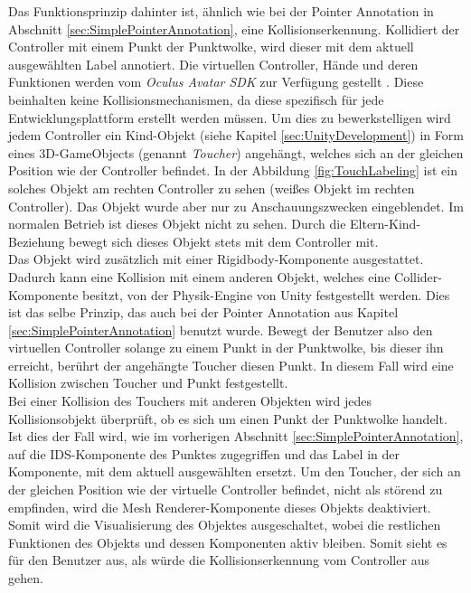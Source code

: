 Das Funktionsprinzip dahinter ist, ähnlich wie bei der Pointer Annotation in Abschnitt \ref{sec:SimplePointerAnnotation}, eine Kollisionserkennung. Kollidiert der Controller mit einem Punkt der Punktwolke, wird dieser mit dem aktuell ausgewählten Label annotiert. Die virtuellen Controller, Hände und deren Funktionen werden vom \textit{Oculus Avatar SDK} zur Verfügung gestellt \cite{bib:AvatarSDK}. Diese beinhalten keine Kollisionsmechanismen, da diese spezifisch für jede Entwicklungsplattform erstellt werden müssen. Um dies zu bewerkstelligen wird jedem Controller ein Kind-Objekt (siehe Kapitel \ref{sec:UnityDevelopment}) in Form eines 3D-GameObjects (genannt \textit{Toucher}) angehängt, welches sich an der gleichen Position wie der Controller befindet. In der Abbildung \ref{fig:TouchLabeling} ist ein solches Objekt am rechten Controller zu sehen (weißes Objekt im rechten Controller). Das Objekt wurde aber nur zu Anschauungszwecken eingeblendet. Im normalen Betrieb ist dieses Objekt nicht zu sehen. Durch die Eltern-Kind-Beziehung bewegt sich dieses Objekt stets mit dem Controller mit.\\

Das Objekt wird zusätzlich mit einer Rigidbody-Komponente ausgestattet. Dadurch kann eine Kollision mit einem anderen Objekt, welches eine Collider-Komponente besitzt, von der Physik-Engine von Unity festgestellt werden. Dies ist das selbe Prinzip, das auch bei der Pointer Annotation aus Kapitel \ref{sec:SimplePointerAnnotation} benutzt wurde. Bewegt der Benutzer also den virtuellen Controller solange zu einem Punkt in der Punktwolke, bis dieser ihn erreicht, berührt der angehängte Toucher diesen Punkt. In diesem Fall wird eine Kollision zwischen Toucher und Punkt festgestellt.\\

Bei einer Kollision des Touchers mit anderen Objekten wird jedes Kollisionsobjekt überprüft, ob es sich um einen Punkt der Punktwolke handelt. Ist dies der Fall wird, wie im vorherigen Abschnitt \ref{sec:SimplePointerAnnotation}, auf die IDS-Komponente des Punktes zugegriffen und das Label in der Komponente, mit dem aktuell ausgewählten ersetzt. Um den Toucher, der sich an der gleichen Position wie der virtuelle Controller befindet, nicht als störend zu empfinden, wird die Mesh Renderer-Komponente dieses Objekts deaktiviert. Somit wird die Visualisierung des Objektes ausgeschaltet, wobei die restlichen Funktionen des Objekts und dessen Komponenten aktiv bleiben. Somit sieht es für den Benutzer aus, als würde die Kollisionserkennung vom Controller aus gehen. 


